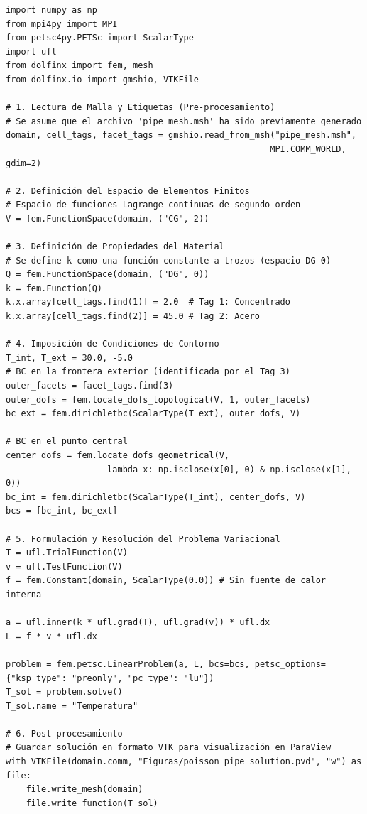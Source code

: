 \begin{codelisting}[h!]
\begin{verbatim}
import numpy as np
from mpi4py import MPI
from petsc4py.PETSc import ScalarType
import ufl
from dolfinx import fem, mesh
from dolfinx.io import gmshio, VTKFile

# 1. Lectura de Malla y Etiquetas (Pre-procesamiento)
# Se asume que el archivo 'pipe_mesh.msh' ha sido previamente generado
domain, cell_tags, facet_tags = gmshio.read_from_msh("pipe_mesh.msh", 
                                                    MPI.COMM_WORLD, gdim=2)

# 2. Definición del Espacio de Elementos Finitos
# Espacio de funciones Lagrange continuas de segundo orden
V = fem.FunctionSpace(domain, ("CG", 2))

# 3. Definición de Propiedades del Material
# Se define k como una función constante a trozos (espacio DG-0)
Q = fem.FunctionSpace(domain, ("DG", 0))
k = fem.Function(Q)
k.x.array[cell_tags.find(1)] = 2.0  # Tag 1: Concentrado
k.x.array[cell_tags.find(2)] = 45.0 # Tag 2: Acero

# 4. Imposición de Condiciones de Contorno
T_int, T_ext = 30.0, -5.0
# BC en la frontera exterior (identificada por el Tag 3)
outer_facets = facet_tags.find(3)
outer_dofs = fem.locate_dofs_topological(V, 1, outer_facets)
bc_ext = fem.dirichletbc(ScalarType(T_ext), outer_dofs, V)

# BC en el punto central
center_dofs = fem.locate_dofs_geometrical(V, 
                    lambda x: np.isclose(x[0], 0) & np.isclose(x[1], 0))
bc_int = fem.dirichletbc(ScalarType(T_int), center_dofs, V)
bcs = [bc_int, bc_ext]

# 5. Formulación y Resolución del Problema Variacional
T = ufl.TrialFunction(V)
v = ufl.TestFunction(V)
f = fem.Constant(domain, ScalarType(0.0)) # Sin fuente de calor interna

a = ufl.inner(k * ufl.grad(T), ufl.grad(v)) * ufl.dx
L = f * v * ufl.dx

problem = fem.petsc.LinearProblem(a, L, bcs=bcs, petsc_options={"ksp_type": "preonly", "pc_type": "lu"})
T_sol = problem.solve()
T_sol.name = "Temperatura"

# 6. Post-procesamiento
# Guardar solución en formato VTK para visualización en ParaView
with VTKFile(domain.comm, "Figuras/poisson_pipe_solution.pvd", "w") as file:
    file.write_mesh(domain)
    file.write_function(T_sol)
\end{verbatim}
\caption{Script de \texttt{dolfinx} para resolver el BVP de Poisson para la tubería.}
\label{lst:poisson-pipe-code-dolfinx}
\end{codelisting}


